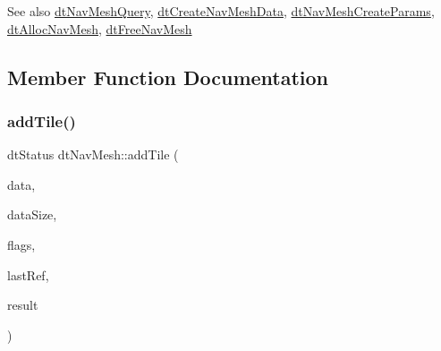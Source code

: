 \begin{DoxySeeAlso}{See also}
\hyperlink{classdtNavMeshQuery}{dt\+Nav\+Mesh\+Query}, \hyperlink{group__detour_gaf56ac19e79e5948fdb1051158577e648}{dt\+Create\+Nav\+Mesh\+Data}, \hyperlink{structdtNavMeshCreateParams}{dt\+Nav\+Mesh\+Create\+Params}, \hyperlink{group__detour_ga73648d53c5a414855a2aa264aab9263c}{dt\+Alloc\+Nav\+Mesh}, \hyperlink{group__detour_gad938af5675a2f62c7c3830b38ea9a184}{dt\+Free\+Nav\+Mesh} 
\end{DoxySeeAlso}


\subsection{Member Function Documentation}
\mbox{\label{classdtNavMesh_a5b5a7c4fa72c08d9a6d4cc4d8cd3bb89}} 
\subsubsection{\texorpdfstring{add\+Tile()}{addTile()}\hspace{0.1cm}{\footnotesize\ttfamily [1/2]}}
{\footnotesize\ttfamily dt\+Status dt\+Nav\+Mesh\+::add\+Tile (\begin{DoxyParamCaption}\item[{unsigned char $\ast$}]{data,  }\item[{int}]{data\+Size,  }\item[{int}]{flags,  }\item[{\hyperlink{group__detour_ga7ea56cfe01bd7c34a81d821d94cbeea5}{dt\+Tile\+Ref}}]{last\+Ref,  }\item[{\hyperlink{group__detour_ga7ea56cfe01bd7c34a81d821d94cbeea5}{dt\+Tile\+Ref} $\ast$}]{result }\end{DoxyParamCaption})}

